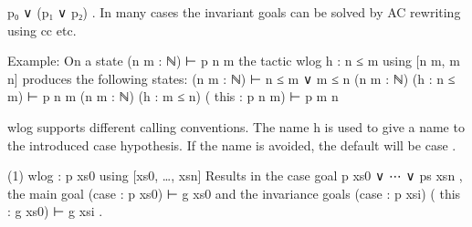 \documentclass{article}
\begin{document}
\colorbox[RGB]{253,246,227}{{{{\color[RGB]{101, 123, 131} p₀  }}}{{{\color[RGB]{181, 137, 0} ∨ }}}{{{\color[RGB]{101, 123, 131}  (p₁  }}}{{{\color[RGB]{181, 137, 0} ∨ }}}{{{\color[RGB]{101, 123, 131}  p₂) }}}}. In many cases
the invariant goals can be solved by AC rewriting using 
\colorbox[RGB]{253,246,227}{{{{\color[RGB]{101, 123, 131} cc }}}} etc.
\par
Example:
On a state 
\colorbox[RGB]{253,246,227}{{{{\color[RGB]{101, 123, 131} (n m : ℕ) ⊢ p n m }}}} the tactic 
\colorbox[RGB]{253,246,227}{{{{\color[RGB]{101, 123, 131} wlog h : n  }}}{{{\color[RGB]{181, 137, 0} ≤ }}}{{{\color[RGB]{101, 123, 131}  m  }}}{{{\color[RGB]{133, 153, 0} using }}}{{{\color[RGB]{101, 123, 131}  {[}n m, m n{]} }}}} produces the following
states:
\colorbox[RGB]{253,246,227}{{{{\color[RGB]{101, 123, 131} (n m : ℕ) ⊢ n  }}}{{{\color[RGB]{181, 137, 0} ≤ }}}{{{\color[RGB]{101, 123, 131}  m  }}}{{{\color[RGB]{181, 137, 0} ∨ }}}{{{\color[RGB]{101, 123, 131}  m  }}}{{{\color[RGB]{181, 137, 0} ≤ }}}{{{\color[RGB]{101, 123, 131}  n }}}}\colorbox[RGB]{253,246,227}{{{{\color[RGB]{101, 123, 131} (n m : ℕ) (h : n  }}}{{{\color[RGB]{181, 137, 0} ≤ }}}{{{\color[RGB]{101, 123, 131}  m) ⊢ p n m }}}}\colorbox[RGB]{253,246,227}{{{{\color[RGB]{101, 123, 131} (n m : ℕ) (h : m  }}}{{{\color[RGB]{181, 137, 0} ≤ }}}{{{\color[RGB]{101, 123, 131}  n) ( }}}{{{\color[RGB]{133, 153, 0} this }}}{{{\color[RGB]{101, 123, 131}  : p n m) ⊢ p m n }}}}\par
\colorbox[RGB]{253,246,227}{{{{\color[RGB]{101, 123, 131} wlog }}}} supports different calling conventions. The name 
\colorbox[RGB]{253,246,227}{{{{\color[RGB]{101, 123, 131} h }}}} is used to give a name to the introduced
case hypothesis. If the name is avoided, the default will be 
\colorbox[RGB]{253,246,227}{{{{\color[RGB]{101, 123, 131} case }}}}.
\par
(1) 
\colorbox[RGB]{253,246,227}{{{{\color[RGB]{101, 123, 131} wlog : p xs0  }}}{{{\color[RGB]{133, 153, 0} using }}}{{{\color[RGB]{101, 123, 131}  {[}xs0, …, xsn{]} }}}}Results in the case goal 
\colorbox[RGB]{253,246,227}{{{{\color[RGB]{101, 123, 131} p xs0  }}}{{{\color[RGB]{181, 137, 0} ∨ }}}{{{\color[RGB]{101, 123, 131}  ⋯  }}}{{{\color[RGB]{181, 137, 0} ∨ }}}{{{\color[RGB]{101, 123, 131}  ps xsn }}}}, the main goal 
\colorbox[RGB]{253,246,227}{{{{\color[RGB]{101, 123, 131} (case : p xs0) ⊢ g xs0 }}}} and the
invariance goals 
\colorbox[RGB]{253,246,227}{{{{\color[RGB]{101, 123, 131} (case : p xsi) ( }}}{{{\color[RGB]{133, 153, 0} this }}}{{{\color[RGB]{101, 123, 131}  : g xs0) ⊢ g xsi }}}}.
\end{document}
